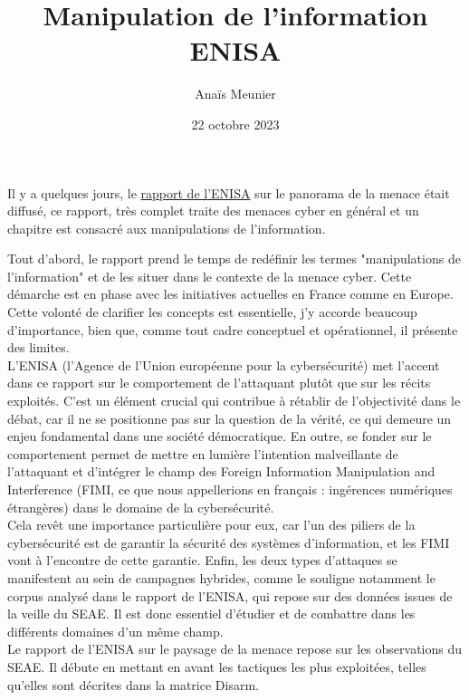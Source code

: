 \documentclass[a4paper]{article}
\title{Manipulation de l'information ENISA}
\author{Anaïs Meunier} %
\date{22 octobre 2023}
\begin{document}
\maketitle                 

Il y a quelques jours, le \href{https://www.enisa.europa.eu/publications/enisa-threat-landscape-2023}{rapport de l'ENISA} sur le panorama de la menace était diffusé, ce rapport, très complet traite des menaces cyber en général et un chapitre est consacré aux manipulations de l'information.

Tout d'abord, le rapport prend le temps de redéfinir les termes "manipulations de l'information" et de les situer dans le contexte de la menace cyber. Cette démarche est en phase avec les initiatives actuelles en France comme en Europe. Cette volonté de clarifier les concepts est essentielle, j'y accorde beaucoup d'importance, bien que, comme tout cadre conceptuel et opérationnel, il présente des limites.
\\

L'ENISA (l'Agence de l'Union européenne pour la cybersécurité) met l'accent dans ce rapport sur le comportement de l'attaquant plutôt que sur les récits exploités. C'est un élément crucial qui contribue à rétablir de l'objectivité dans le débat, car il ne se positionne pas sur la question de la vérité, ce qui demeure un enjeu fondamental dans une société démocratique. En outre, se fonder sur le comportement permet de mettre en lumière l'intention malveillante de l'attaquant et d'intégrer le champ des Foreign Information Manipulation and Interference (FIMI, ce que nous appellerions en français : ingérences numériques étrangères) dans le domaine de la cybersécurité.
\\

Cela revêt une importance particulière pour eux, car l'un des piliers de la cybersécurité est de garantir la sécurité des systèmes d'information, et les FIMI vont à l'encontre de cette garantie. Enfin, les deux types d'attaques se manifestent au sein de campagnes hybrides, comme le souligne notamment le corpus analysé dans le rapport de l'ENISA, qui repose sur des données issues de la veille du SEAE. Il est donc essentiel d'étudier et de combattre dans les différents domaines d'un même champ.
\\

Le rapport de l'ENISA sur le paysage de la menace repose sur les observations du SEAE. Il débute en mettant en avant les tactiques les plus exploitées, telles qu'elles sont décrites dans la matrice Disarm.
\\
\end{document}
